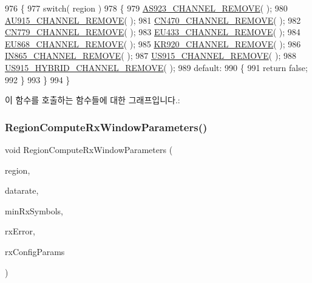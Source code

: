 \begin{DoxyCode}
976 \{
977     \textcolor{keywordflow}{switch}( region )
978     \{
979         \mbox{\hyperlink{_region_8c_aef31561789c92f75d8d281621cb725e0}{AS923\_CHANNEL\_REMOVE}}( );
980         \mbox{\hyperlink{_region_8c_a769217b0ee44f46ba326d2f21139c313}{AU915\_CHANNEL\_REMOVE}}( );
981         \mbox{\hyperlink{_region_8c_aad42e58f0a57ce809648ff6796c591ce}{CN470\_CHANNEL\_REMOVE}}( );
982         \mbox{\hyperlink{_region_8c_a3df278ad93bb55f2e38572cce5fdd7c7}{CN779\_CHANNEL\_REMOVE}}( );
983         \mbox{\hyperlink{_region_8c_a05d2373ec17f4c84eb7b70d2cdc0f80f}{EU433\_CHANNEL\_REMOVE}}( );
984         \mbox{\hyperlink{_region_8c_a8c8f3aaa13109cc1d5e02135c53bdb7b}{EU868\_CHANNEL\_REMOVE}}( );
985         \mbox{\hyperlink{_region_8c_a836ba77166ae74458646a33459f80cd9}{KR920\_CHANNEL\_REMOVE}}( );
986         \mbox{\hyperlink{_region_8c_a2b4c93d0e855fcfae15b243743d171a7}{IN865\_CHANNEL\_REMOVE}}( );
987         \mbox{\hyperlink{_region_8c_adddc3bf5130a83ab73bdbe878f1e6fb4}{US915\_CHANNEL\_REMOVE}}( );
988         \mbox{\hyperlink{_region_8c_a7e7e276bd4b63511d3849f52392673d3}{US915\_HYBRID\_CHANNEL\_REMOVE}}( );
989         \textcolor{keywordflow}{default}:
990         \{
991             \textcolor{keywordflow}{return} \textcolor{keyword}{false};
992         \}
993     \}
994 \}
\end{DoxyCode}
이 함수를 호출하는 함수들에 대한 그래프입니다.\+:
\mbox{\label{group___r_e_g_i_o_n_gabd3eb4e7db9b7987fabb9568f733a2b9}} 
\subsubsection{\texorpdfstring{Region\+Compute\+Rx\+Window\+Parameters()}{RegionComputeRxWindowParameters()}}
{\footnotesize\ttfamily void Region\+Compute\+Rx\+Window\+Parameters (\begin{DoxyParamCaption}\item[{\mbox{\hyperlink{group___l_o_r_a_m_a_c_ga80c48efda9ae02e14b58160d34a798dd}{Lo\+Ra\+Mac\+Region\+\_\+t}}}]{region,  }\item[{int8\+\_\+t}]{datarate,  }\item[{uint8\+\_\+t}]{min\+Rx\+Symbols,  }\item[{uint32\+\_\+t}]{rx\+Error,  }\item[{\mbox{\hyperlink{group___r_e_g_i_o_n_ga375c038078dfcfc7ef14280021db719e}{Rx\+Config\+Params\+\_\+t}} $\ast$}]{rx\+Config\+Params }\end{DoxyParamCaption})}

